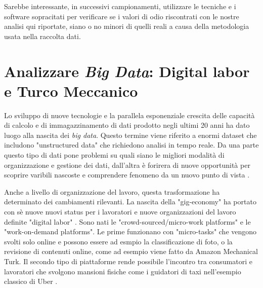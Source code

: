 Sarebbe interessante, in successivi campionamenti, utilizzare le tecniche e i software sopracitati per verificare se i valori di odio riscontrati con le nostre analisi qui riportate, siano o no minori di quelli reali a causa della metodologia usata nella raccolta dati.

\section{Analizzare \textit{Big Data}: Digital labor e Turco Meccanico }
Lo sviluppo di nuove tecnologie e la parallela esponenziale crescita delle capacità di calcolo e di immagazzinamento di dati prodotto negli ultimi 20 anni ha dato luogo alla nascita dei \textit{big data}. Questo termine viene riferito a enormi dataset che includono "unstructured data" che richiedono analisi in tempo reale. Da una parte questo tipo di dati pone problemi su quali siano le migliori modalità di organizzazione e gestione dei dati, dall'altra è forirera di nuove opportunità per scoprire varibili nascoste e comprendere fenomeno da un nuovo punto di vista \citep{chen2014}.

Anche a livello di organizzazione del lavoro, questa trasformazione ha determinato dei cambiamenti rilevanti. La nascita della "gig-economy"  ha portato con sè nuove nuovi status per i lavoratori e nuove organizzazioni del lavoro definite "digital labor" \citep{stefano2016}. Sono nati le "crowd-sourced/micro-work platforms" e le "work-on-demand platforms". Le prime funzionano con "micro-tasks" che vengono svolti solo online e possono essere ad esmpio la classificazione di foto, o la revisione di contenuti online, come ad esempio viene fatto da Amazon Mechanical Turk. Il secondo tipo di piattaforme rende possibile l'incontro tra consumatori e lavoratori che svolgono mansioni fisiche come i guidatori di taxi nell'esempio classico di Uber \citep{floridi2020}. 

